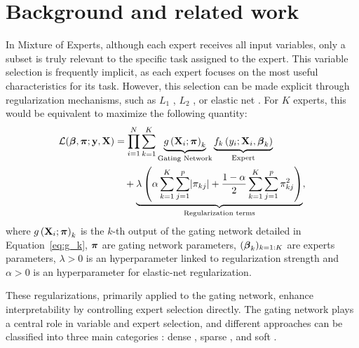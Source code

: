 \section{Background and related work}




In Mixture of Experts, although each expert receives all input variables, only a subset is truly relevant to the specific task assigned to the expert. This variable selection is frequently implicit, as each expert focuses on the most useful characteristics for its task. However, this selection can be made explicit through regularization mechanisms, such as $L_1$ \citep{courbariaux2022sparse}, $L_2$ \citep{jordan1994hierarchical}, or elastic net \citep{chamroukhi2019regularized, ma2018modeling}. For $K$ experts, this would be equivalent %
to maximize the following quantity:
%
\begin{align}
    \mathcal{L}(\boldsymbol{\beta},\boldsymbol{\pi} ; \mathbf{y},\mathbf{X}) &= \prod_{i=1}^N \sum_{k=1}^K \underbrace{g\left(\mathbf{X}_i ; \boldsymbol{\pi} \right)_k}_{\text{Gating Network}}
   \underbrace{ f_k\left(y_i; \mathbf{X}_i, \boldsymbol{\beta}_k\right)}_{\text{Expert}} \notag
   \\ &\quad + \underbrace{\lambda \left( \alpha \sum_{k=1}^K \sum_{j=1}^p \lvert \pi_{kj} \rvert  + \dfrac{1-\alpha}{2}\sum_{k=1}^K \sum_{j=1}^p \pi_{kj}^2\right) }_{\text{Regularization terms}},
\end{align}
%
where $g\left(\mathbf{X}_i ; \boldsymbol{\pi} \right)_k$ is the $k$-th output of the gating network detailed in Equation~\eqref{eq:g_k}, $\boldsymbol{\pi}$ are gating network parameters, $(\boldsymbol{\beta}_k)_{k=1:K}$ are experts parameters, $\lambda>0$ is an hyperparameter linked to regularization strength and $\alpha>0$ is an hyperparameter for elastic-net regularization.

These regularizations, primarily applied to the gating network, enhance interpretability by controlling expert selection directly. The gating network plays a central role in variable and expert selection, and different approaches can be classified into three main categories \cite{cai2024survey}: dense \citep{wu2023mole, pan2024dense}, sparse \citep{jiang2024mixtral, tan2023sparse, zhou2022mixture}, and soft \citep{puigcerver2023sparse, zadouri2023pushing}. 


